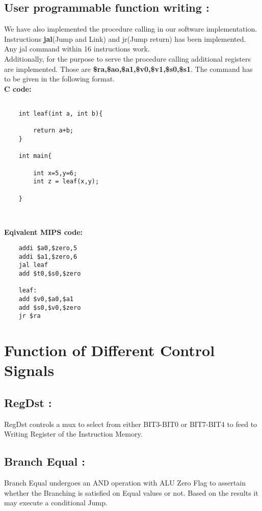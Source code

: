 \documentclass[12pt]{article}
\begin{document}
\subsection{User programmable function writing : }

We have also implemented the procedure calling in our software implementation. Instructions \textbf{jal}(Jump and Link) and jr(Jump return) has been implemented.\\
Any jal command within 16 instructions work.\\
Additionally, for the purpose to serve the procedure calling additional registers are implemented. Those are \textbf{\$ra,\$ao,\$a1,\$v0,\$v1,\$s0,\$s1}. The command has to be given in the following format.\\

\textbf{C code: }
\begin{verbatim}

    int leaf(int a, int b){

        return a+b;
    }

    int main{

        int x=5,y=6;
        int z = leaf(x,y);
        
    }
    
    
\end{verbatim}

\textbf{Eqivalent MIPS code: }
\begin{verbatim}
    addi $a0,$zero,5
    addi $a1,$zero,6
    jal leaf
    add $t0,$s0,$zero

    leaf:
    add $v0,$a0,$a1
    add $s0,$v0,$zero
    jr $ra
\end{verbatim}
\section{Function of Different Control Signals} 

\subsection{RegDst : }

RegDst controls a mux to select from either BIT3-BIT0 or BIT7-BIT4 to feed to Writing Register of the Instruction Memory.
\subsection{Branch Equal : }

Branch Equal undergoes an AND operation with ALU Zero Flag to assertain whether the Branching is satisfied on Equal values or not. Based on the results it may execute a conditional Jump.
\end{document}
